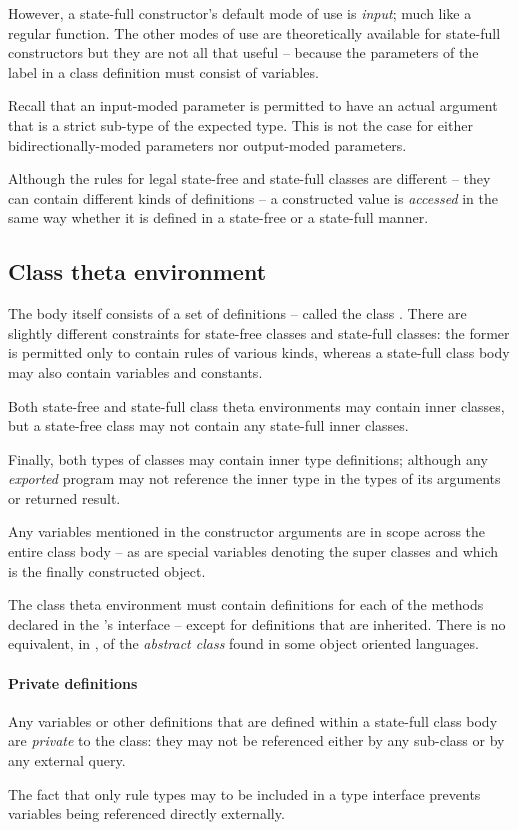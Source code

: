 However, a state-full constructor's default mode of use is \emph{input}; much like a regular function. The other modes of use are theoretically available for state-full constructors but they are not all that useful -- because the parameters of the label in a class definition must consist of variables.

Recall that an input-moded parameter is permitted to have an actual argument that is a strict sub-type of the expected type. This is not the case for either bidirectionally-moded parameters nor output-moded parameters.

Although the rules for legal state-free and state-full classes are different -- they can contain different kinds of definitions -- a constructed value is \emph{accessed} in the same way whether it is defined in a state-free or a state-full manner. 

\subsection{Class theta environment}
The body itself consists of a set of definitions -- called the class . There are slightly different constraints for state-free classes and state-full classes: the former is permitted only to contain rules of various kinds, whereas a state-full class body may also contain variables and constants.

Both state-free and state-full class theta environments may contain inner classes, but a state-free class may not contain any state-full inner classes.

Finally, both types of classes may contain inner type definitions; although any \emph{exported} program may not reference the inner type in the types of its arguments or returned result.

Any variables mentioned in the constructor arguments are in scope across the entire class body -- as are special variables denoting the super classes and  which is the finally constructed object.

The class theta environment must contain definitions for each of the methods declared in the \emph{}'s interface -- except for definitions that are inherited. There is no equivalent, in \go, of the \emph{abstract class} found in some object oriented languages.

\paragraph{Private definitions}
Any variables or other definitions that are defined within a state-full class body are \emph{private} to the class: they may not be referenced either by any sub-class or by any external query.
\begin{aside}
The fact that only rule types may to be included in a type interface prevents variables being referenced directly externally.
\end{aside}

